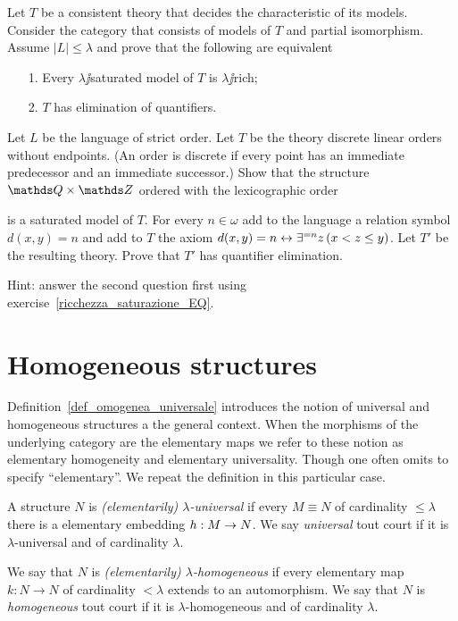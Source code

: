 \documentclass[creche.tex]{subfiles}
\begin{document}
\begin{exercise}\label{ricchezza_saturazione_EQ}
Let $T$ be a consistent theory that decides the characteristic of its models. Consider the category that consists of models of $T$ and partial isomorphism. Assume $|L|\le\lambda$ and prove that the following are equivalent
\begin{itemize}
\item[1.] Every $\lambda\jj$saturated model of $T$ is $\lambda\jj$rich;
\item[2.] $T$ has elimination of quantifiers.\QED
\end{itemize}
\end{exercise}

\begin{exercise}\label{ex_QQxZZ_saturo}
Let $L$ be the language of strict order. Let $T$ be the theory discrete linear orders without endpoints. (An order is discrete if every point has an immediate predecessor and an immediate successor.) Show that the structure $\QQ\times\ZZ$ ordered with the lexicographic order 


is a saturated model of $T$. For every $n\in\omega$ add to the language a relation symbol $d(x,y)=n$ and add to $T$ the axiom $d(x,y)=n\leftrightarrow\exists^{=n} z\,(x<z\le y)$.   Let $T'$ be the resulting theory. Prove that $T'$ has quantifier elimination. 

Hint: answer the second question first using exercise~\ref{ricchezza_saturazione_EQ}.\QED 
\end{exercise}


\section{Homogeneous structures}\label{homogeneous}
Definition~\ref{def_omogenea_universale} introduces the notion of universal and homogeneous structures a the general context. When the morphisms of the underlying category are the elementary maps we refer to these notion as elementary homogeneity and elementary universality. Though one often omits to specify ``elementary''. We repeat the definition in this particular case. 

\begin{definition}
A structure $N$ is \emph{(elementarily) $\lambda$-universal\/} if every $M\equiv N$ of cardinality $\le\lambda$ there is a elementary embedding $h:M\rightarrow N$. We say  \emph{universal\/} tout court if it is $\lambda$-universal and of cardinality $\lambda$.

We say that $N$ is \emph{(elementarily) $\lambda$-homogeneous\/} if every elementary map $k:N\to N$ of cardinality $<\lambda$ extends to an automorphism. We say that $N$ is \emph{homogeneous\/} tout court if it is $\lambda$-homogeneous and of cardinality $\lambda$.\QED
\end{definition}
\end{document}
